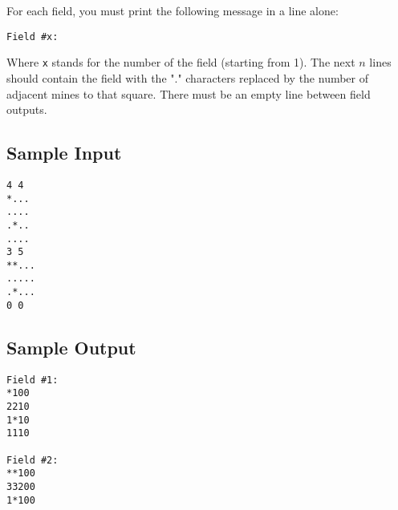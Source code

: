 For each field, you must print the following message in a line alone:

\begin{verbatim}
Field #x:
\end{verbatim}

Where \texttt{x} stands for the number of the field (starting from 1). The next $n$ lines should
contain the field with the "." characters replaced by the number of adjacent mines
to that square. There must be an empty line between field outputs.

\subsection*{Sample Input}

\begin{verbatim}
4 4
*...
....
.*..
....
3 5
**...
.....
.*...
0 0
\end{verbatim}

\subsection*{Sample Output}

\begin{verbatim}
Field #1:
*100
2210
1*10
1110

Field #2:
**100
33200
1*100
\end{verbatim}

